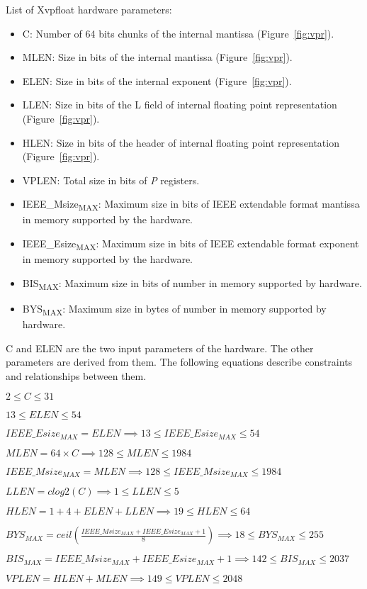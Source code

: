 List of Xvpfloat hardware parameters:
\begin{itemize}[topsep=0pt]
    \item C: Number of 64 bits chunks of the internal mantissa (Figure~\ref{fig:vpr}).
    \item MLEN: Size in bits of the internal mantissa (Figure~\ref{fig:vpr}).
    \item ELEN: Size in bits of the internal exponent (Figure~\ref{fig:vpr}).
    \item LLEN: Size in bits of the L field of internal floating point representation (Figure~\ref{fig:vpr}).
    \item HLEN: Size in bits of the header of internal floating point representation (Figure~\ref{fig:vpr}).
    \item VPLEN: Total size in bits of {\em P} registers.
    \item IEEE\_Msize\textsubscript{MAX}: Maximum size in bits of IEEE extendable format mantissa in memory supported by the hardware.
    \item IEEE\_Esize\textsubscript{MAX}: Maximum size in bits of IEEE extendable format exponent in memory supported by the hardware.
    \item BIS\textsubscript{MAX}: Maximum size in bits of number in memory supported by hardware.
    \item BYS\textsubscript{MAX}: Maximum size in bytes of number in memory supported by hardware.
\end{itemize}

C and ELEN are the two input parameters of the hardware. 
The other parameters are derived from them. 
The following equations describe constraints and relationships between them.

$ 2 \leq C \leq 31$

$13 \leq ELEN \leq 54$

$IEEE\_Esize_{MAX} = ELEN \implies 13 \leq IEEE\_Esize_{MAX} \leq 54$

$MLEN = 64 \times C \implies 128 \leq MLEN \leq 1984$

$IEEE\_Msize_{MAX} = MLEN \implies 128 \leq IEEE\_Msize_{MAX} \leq 1984$

$LLEN = clog2( C ) \implies 1 \leq LLEN \leq 5$

$HLEN = 1+4+ELEN+LLEN \implies 19 \leq HLEN \leq 64$

$BYS_{MAX} = ceil( \frac{IEEE\_Msize_{MAX}+IEEE\_Esize_{MAX}+1}{8} ) \implies 18 \leq BYS_{MAX} \leq 255$

$BIS_{MAX} = IEEE\_Msize_{MAX}+IEEE\_Esize_{MAX}+1 \implies 142 \leq BIS_{MAX} \leq 2037$

$VPLEN = HLEN+MLEN \implies 149 \leq VPLEN \leq 2048$
